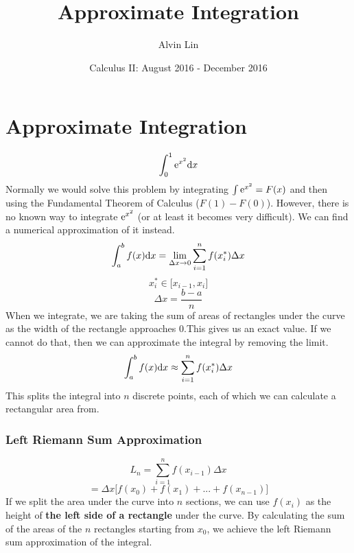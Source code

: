 \documentclass[letterpaper, 12pt]{math}
\title{Approximate Integration}
\author{Alvin Lin}
\date{Calculus II: August 2016 - December 2016}
\begin{document}
\maketitle

\section*{Approximate Integration}
\[ \int_{0}^{1}{\mathrm{e}^{x^{2}}\mathrm{d}{x}} \]
Normally we would solve this problem by integrating
\( \int{\mathrm{e}^{x^{2}}} = F(x) \) and
then using the Fundamental Theorem of Calculus (\( F(1)-F(0) \)). However, there
is no known way to integrate \( \mathrm{e}^{x^{2}} \) (or at least it becomes very
difficult). We can find a numerical approximation of it instead.
\[ \int_{a}^{b}{f(x)\mathrm{d}{x}} = \lim_{\Delta x \to 0}
   \sum_{i=1}^{n}{f(x_{i}^{*})\Delta x} \]
\[ x_{i}^{*}\in\bigg[x_{i-1},x_{i}\bigg] \]
\[ \Delta x = \frac{b-a}{n} \]
When we integrate, we are taking the sum of areas of rectangles under the curve
as the width of the rectangle approaches 0.This gives us an exact value. If we
cannot do that, then we can approximate the integral by removing the limit.
\[ \int_{a}^{b}{f(x)\mathrm{d}{x}} \approx \sum_{i=1}^{n}{f(x_{i}^{*})\Delta x} \]
This splits the integral into \( n \) discrete points, each of which we can
calculate a rectangular area from.

\subsubsection*{Left Riemann Sum Approximation}
\[ L_{n} = \sum_{i=1}^{n}{f(x_{i-1})\Delta x} \]
\[ = \Delta x\bigg[f(x_{0})+f(x_{1})+...+f(x_{n-1})\bigg] \]
If we split the area under the curve into \(n\) sections, we can use
\( f(x_{i}) \) as the height of \textbf{the left side of a rectangle} under the
curve. By calculating the sum of the areas of the \(n\) rectangles starting from
\( x_{0} \), we achieve the left Riemann sum approximation of the integral.
\begin{center}
\end{center}
\end{document}
